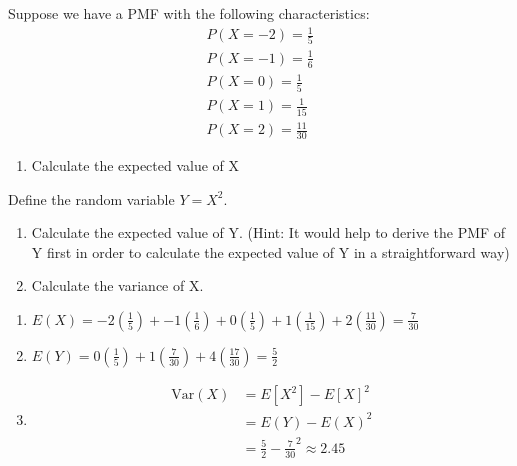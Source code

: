 \documentclass[
]{article}
\begin{document}
\begin{exercise}
\protect\hypertarget{exr:expvar}{}\label{exr:expvar}

Suppose we have a PMF with the following characteristics:
\begin{eqnarray*}
  P(X = -2) = \frac{1}{5}\\
  P(X = -1) = \frac{1}{6}\\
  P(X = 0) = \frac{1}{5}\\
  P(X = 1) = \frac{1}{15}\\
  P(X = 2) = \frac{11}{30}
\end{eqnarray*}

\begin{enumerate}
\def\labelenumi{\arabic{enumi}.}
\tightlist
\item
  Calculate the expected value of X
\end{enumerate}

Define the random variable \(Y = X^2\).

\begin{enumerate}
\def\labelenumi{\arabic{enumi}.}
\setcounter{enumi}{1}
\item
  Calculate the expected value of Y. (Hint: It would help to derive the PMF of Y first in order to calculate the expected value of Y in a straightforward way)
\item
  Calculate the variance of X.
\end{enumerate}

\end{exercise}

\begin{answer}
\noindent
\begin{enumerate}
\item $E(X) = -2(\frac{1}{5}) + -1(\frac{1}{6}) + 0(\frac{1}{5}) + 1(\frac{1}{15}) + 2(\frac{11}{30}) = \frac{7}{30}$
\item $E(Y) = 0(\frac{1}{5}) + 1(\frac{7}{30}) + 4(\frac{17}{30}) = \frac{5}{2}$
\item \begin{align*}
\text{Var}(X) &= E[X^2] - E[X]^2\\
&= E(Y) - E(X)^2\\
&= \frac{5}{2} - \frac{7}{30}^2 \approx 2.45
\end{align*}
\end{enumerate}
\end{answer}
\end{document}
